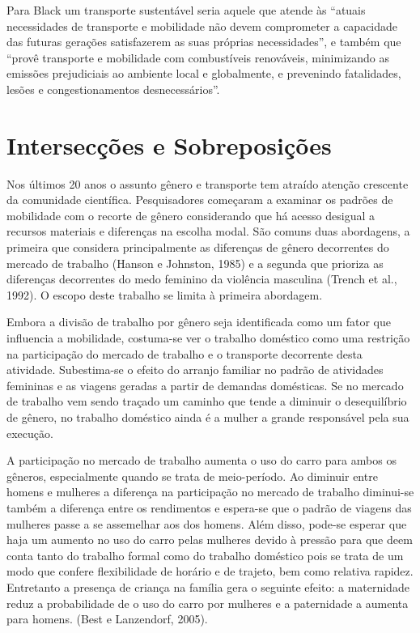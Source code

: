 Para Black um transporte sustentável seria aquele que atende às ``atuais necessidades de transporte e mobilidade não devem comprometer a capacidade das futuras gerações satisfazerem as suas próprias necessidades''\cite[p.151]{BLACK1996}, e também que ``provê transporte e mobilidade com combustíveis renováveis, minimizando as emissões prejudiciais ao ambiente local e globalmente, e prevenindo fatalidades, lesões e congestionamentos desnecessários''\cite[p.12]{BLACK2010}.

\section{Intersecções e Sobreposições}

Nos últimos 20 anos o assunto gênero e transporte tem atraído atenção crescente da comunidade científica. Pesquisadores começaram a examinar os padrões de mobilidade com o recorte de gênero considerando que há acesso desigual a recursos materiais e diferenças na escolha modal. São comuns duas abordagens, a primeira que considera principalmente as diferenças de gênero decorrentes do mercado de trabalho (Hanson e Johnston, 1985) e a segunda que prioriza as diferenças decorrentes do medo feminino da violência masculina (Trench et al., 1992). O escopo deste trabalho se limita à primeira abordagem.

Embora a divisão de trabalho por gênero seja identificada como um fator que influencia a mobilidade, costuma-se ver o trabalho doméstico como uma restrição na participação do mercado de trabalho e o transporte decorrente desta atividade. Subestima-se o efeito do arranjo familiar no padrão de atividades femininas e as viagens geradas a partir de demandas domésticas. Se no mercado de trabalho vem sendo traçado um caminho que tende a diminuir o desequilíbrio de gênero, no trabalho doméstico ainda é a mulher a grande responsável pela sua execução.

A participação no mercado de trabalho aumenta o uso do carro para ambos os gêneros, especialmente quando se trata de meio-período. Ao diminuir entre homens e mulheres a diferença na participação no mercado de trabalho diminui-se também a diferença entre os rendimentos e espera-se que o padrão de viagens das mulheres passe a se assemelhar aos dos homens. Além disso, pode-se esperar que haja um aumento no uso do carro pelas mulheres devido à pressão para que deem conta tanto do trabalho formal como do trabalho doméstico pois se trata de um modo que confere flexibilidade de horário e de trajeto, bem como relativa rapidez. Entretanto a presença de criança na família gera o seguinte efeito: a maternidade reduz a probabilidade de o uso do carro por mulheres e a paternidade a aumenta para homens. (Best e Lanzendorf, 2005).


